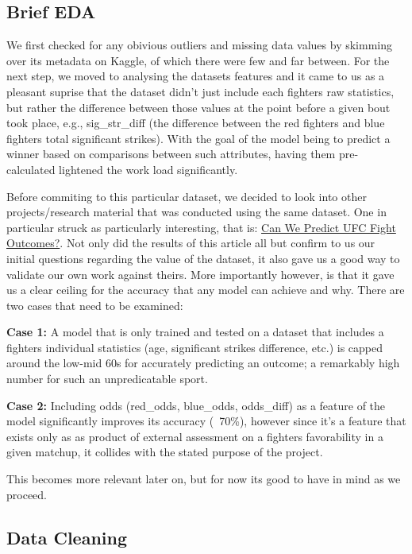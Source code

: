 \documentclass[11pt]{article}
\begin{document}
\subsection{Brief EDA}

We first checked for any obivious outliers and missing data values by skimming over its metadata on Kaggle, of which there were few and far between. For the next step, we moved to analysing the datasets features 
and it came to us as a pleasant suprise that the dataset didn't just include each fighters raw statistics, but rather the difference between those values at the point before a given bout took place, 
e.g., sig\_str\_diff (the difference between the red fighters and blue fighters total significant strikes). With the goal of the model being to predict a winner based on comparisons between such attributes, 
having them pre-calculated lightened the work load significantly.\par   

Before commiting to this particular dataset, we decided to look into other projects/research material that was conducted using the same dataset. One in particular struck as particularly interesting, that is:
\href{https://www.kaggle.com/code/tahaberkterekli/can-we-predict-ufc-fight-outcomes}{Can We Predict UFC Fight Outcomes?}. Not only did the results of this article all but confirm to us our initial questions 
regarding the value of the dataset, it also gave us a good way to validate our own work against theirs. More importantly however, is that it gave us a clear ceiling for the accuracy that any model can achieve
and why. There are two cases that need to be examined:

\textbf{Case 1:} A model that is only trained and tested on a dataset that includes a fighters individual statistics (age, significant strikes difference, etc.) is capped around the low-mid 60s for accurately 
predicting an outcome; a remarkably high number for such an unpredicatable sport.

\textbf{Case 2:} Including odds (red\_odds, blue\_odds, odds\_diff) as a feature of the model significantly improves its accuracy (~70\%), however since it's a feature that exists only as as product of external 
assessment on a fighters favorability in a given matchup, it collides with the stated purpose of the project. 

This becomes more relevant later on, but for now its good to have in mind as we proceed.

\subsection{Data Cleaning}
\end{document}

